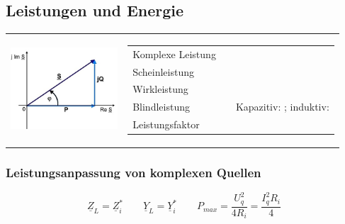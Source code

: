 \subsection{Leistungen und Energie}
	\begin{tabular}{ll}
   		\parbox{4cm}{
   			\includegraphics[width=4cm]{./images/zeigerdiag-leistungen.png}}
   		& \parbox{14cm}{
			\begin{tabular}{p{3cm}p{4.5cm}p{5.5cm}}
	      		\multirow{2}{4cm}{Komplexe Leistung}  &
	      			$ \underline{S} = P + jQ$  &\\
	      			& \multicolumn{2}{l}{$ \underline{S} = \underline{U} \cdot \underline{I}^\ast = U\cdot I \cdot e^{j(\varphi_u-\varphi_i)} = \frac{\underline{U}^2}{\underline{Z}^*} = \underline{I}^2 \cdot \underline{Z} = \underline{U}^2\cdot\underline{Y}^*$}\\
				Scheinleistung
					& $ S = | \underline{S} | = U I = \frac{U^2}{Z} = I^2 Z$ 
					& \\
				Wirkleistung
					& $ P = \Real(\underline{S}) = U I \cos(\varphi) $ \\
				Blindleistung 
					& $ Q = \Imag(\underline{S}) = U I \sin(\varphi) $
					& Kapazitiv: $Q < 0$; induktiv: $Q > 0$ \\
				Leistungsfaktor
					& $\cos \varphi = \frac{P}{S} = \frac{P}{UI}$ \\
			\end{tabular}}
   	\end{tabular}
\subsubsection{Leistungsanpassung von komplexen Quellen}
	\begin{equation*}
		\boxed{\underline{Z}_L = \underline{Z}_i^{\ast}} \qquad \underline{Y}_L = \underline{Y}_i^{\ast} \qquad P_{max} = \frac{U_q^2}{4R_i} = \frac{I_q^2 R_i}{4} 
	\end{equation*}   	

